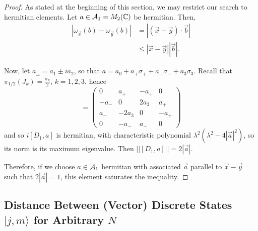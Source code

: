 \begin{proof}
As stated at the beginning of this section, we may restrict our search to hermitian elements. Let $a \in \mathcal A_1 = M_2(\mathbb{C})$ be hermitian. Then,
\begin{align*}
    |\omega_{\vec x}(b) - \omega_{\vec y}(b)| &= |(\vec x - \vec y)\cdot \vec b| \\
        &\leq |\vec x - \vec y||\vec b|.
\end{align*}

Now, let $a_\pm = a_1 \pm i a_2$, so that $a = a_0 + a_+ \sigma_+ + a_- \sigma_- + a_3 \sigma_3$. Recall that $\pi_{1/2}(J_k) = \frac{\sigma_k}{2}$, $k = 1, 2, 3$, hence
\begin{equation*}
    [D_1, a] = 
    \begin{pmatrix}
    0 & a_+ & -a_+ & 0\\
    -a_- & 0 & 2a_3 & a_+ \\
    a_- & -2a_3 & 0 & -a_+ \\
    0 & -a_- & a_- & 0
    \end{pmatrix}
\end{equation*}
and so $i[D_1, a]$ is hermitian, with characteristic polynomial $\lambda^2(\lambda^2 -4|\vec a|^2)$, so its norm is its maximum eigenvalue. Then $||[D_1, a]|| = 2 |\vec a|$.

Therefore, if we choose $a \in \mathcal A_1$ hermitian with associated $\vec a$ parallel to $\vec x - \vec y$ such that $2|\vec a| = 1$, this element saturates the inequality.
\end{proof}

\subsection{Distance Between (Vector) Discrete States $|j,m\rangle$ for Arbitrary $N$}

